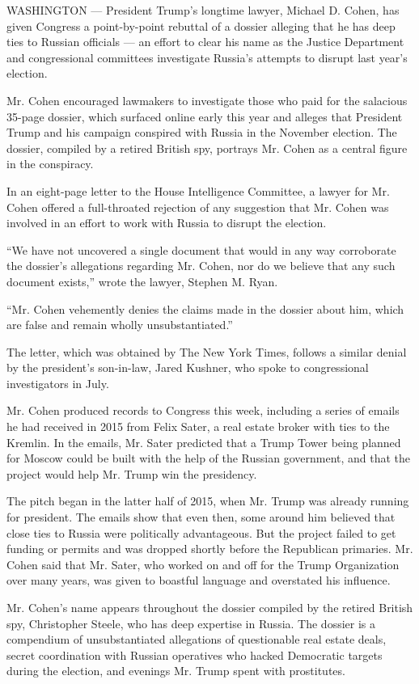 WASHINGTON --- President Trump's longtime lawyer, Michael D. Cohen, has
given Congress a point-by-point rebuttal of a dossier alleging that he
has deep ties to Russian officials --- an effort to clear his name as
the Justice Department and congressional committees investigate Russia's
attempts to disrupt last year's election.

Mr. Cohen encouraged lawmakers to investigate those who paid for the
salacious 35-page dossier, which surfaced online early this year and
alleges that President Trump and his campaign conspired with Russia in
the November election. The dossier, compiled by a retired British spy,
portrays Mr. Cohen as a central figure in the conspiracy.

In an eight-page letter to the House Intelligence Committee, a lawyer
for Mr. Cohen offered a full-throated rejection of any suggestion that
Mr. Cohen was involved in an effort to work with Russia to disrupt the
election.

``We have not uncovered a single document that would in any way
corroborate the dossier's allegations regarding Mr. Cohen, nor do we
believe that any such document exists,'' wrote the lawyer, Stephen M.
Ryan.

``Mr. Cohen vehemently denies the claims made in the dossier about him,
which are false and remain wholly unsubstantiated.''

The letter, which was obtained by The New York Times, follows a similar
denial by the president's son-in-law, Jared Kushner, who spoke to
congressional investigators in July.

Mr. Cohen produced records to Congress this week, including a series of
emails he had received in 2015 from Felix Sater, a real estate broker
with ties to the Kremlin. In the emails, Mr. Sater predicted that a
Trump Tower being planned for Moscow could be built with the help of the
Russian government, and that the project would help Mr. Trump win the
presidency.

The pitch began in the latter half of 2015, when Mr. Trump was already
running for president. The emails show that even then, some around him
believed that close ties to Russia were politically advantageous. But
the project failed to get funding or permits and was dropped shortly
before the Republican primaries. Mr. Cohen said that Mr. Sater, who
worked on and off for the Trump Organization over many years, was given
to boastful language and overstated his influence.

Mr. Cohen's name appears throughout the dossier compiled by the retired
British spy, Christopher Steele, who has deep expertise in Russia. The
dossier is a compendium of unsubstantiated allegations of questionable
real estate deals, secret coordination with Russian operatives who
hacked Democratic targets during the election, and evenings Mr. Trump
spent with prostitutes.

